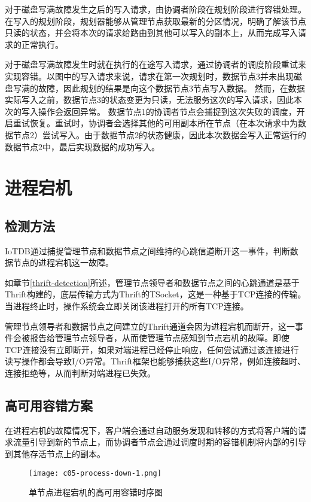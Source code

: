 对于磁盘写满故障发生之后的写入请求，由协调者阶段在规划阶段进行容错处理。
在写入的规划阶段，规划器能够从管理节点获取最新的分区情况，明确了解该节点只读的状态，并会将本次的请求给路由到其他可以写入的副本上，从而完成写入请求的正常执行。

对于磁盘写满故障发生时就在执行的在途写入请求，通过协调者的调度阶段重试来实现容错。以图中的写入请求来说，请求在第一次规划时，数据节点3并未出现磁盘写满的故障，因此规划的结果是向这个数据节点3节点写入数据。
然而，在数据实际写入之前，数据节点3的状态变更为只读，无法服务这次的写入请求，因此本次的写入操作会返回异常。
数据节点1的协调者节点会捕捉到这次失败的调度，开启重试恢复。重试时，协调者会选择其他的可用副本所在节点（在本次请求中为数据节点2）尝试写入。由于数据节点2的状态健康，因此本次数据会写入正常运行的数据节点2中，最后实现数据的成功写入。


\section{进程宕机}

\subsection{检测方法}

IoTDB通过捕捉管理节点和数据节点之间维持的心跳信道断开这一事件，判断数据节点的进程宕机这一故障。

如章节\ref{thrift-detection}所述，管理节点领导者和数据节点之间的心跳通道是基于Thrift构建的，底层传输方式为Thrift的TSocket，这是一种基于TCP连接的传输。
当进程终止时，操作系统会立即关闭该进程打开的所有TCP连接。

管理节点领导者和数据节点之间建立的Thrift通道会因为进程宕机而断开，这一事件会被报告给管理节点领导者，从而使管理节点感知到节点宕机的故障。即使TCP连接没有立即断开，如果对端进程已经停止响应，任何尝试通过该连接进行读写操作都会导致I/O异常。Thrift框架也能够捕获这些I/O异常，例如连接超时、连接拒绝等，从而判断对端进程已失效。


\subsection{高可用容错方案}

在进程宕机的故障情况下，客户端会通过自动服务发现和转移的方式将客户端的请求流量引导到新的节点上，而协调者节点会通过调度时期的容错机制将内部的\fragmentinstance 引导到其他存活节点上的副本。

\begin{figure}
    \centering
    \texttt{[image: c05-process-down-1.png]}
    \caption{单节点进程宕机的高可用容错时序图}
    \label{fig:c05-process-down-1}
\end{figure}

